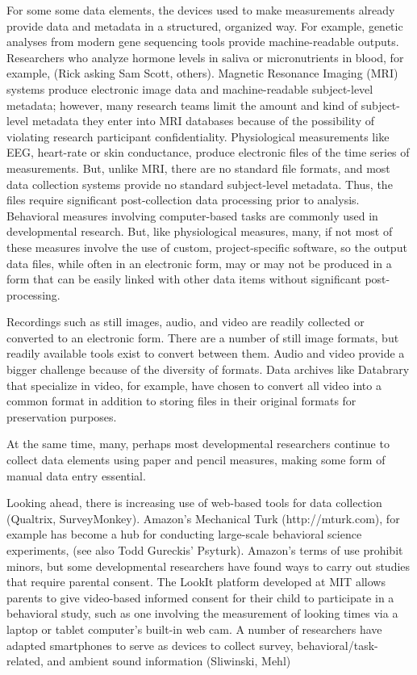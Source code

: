 \documentclass[letterpaper,man,apacite]{apa6}
\begin{document}
For some some data elements, the devices used to make measurements already provide data and metadata in a structured, organized way.
For example, genetic analyses from modern gene sequencing tools provide machine-readable outputs.
Researchers who analyze hormone levels in saliva or micronutrients in blood, for example, (Rick asking Sam Scott, others).
Magnetic Resonance Imaging (MRI) systems produce electronic image data and machine-readable subject-level metadata; however, many research teams limit the amount and kind of subject-level metadata they enter into MRI databases because of the possibility of violating research participant confidentiality.
Physiological measurements like EEG, heart-rate or skin conductance, produce electronic files of the time series of measurements.
But, unlike MRI, there are no standard file formats, and most data collection systems provide no standard subject-level metadata.
Thus, the files require significant post-collection data processing prior to analysis. 
Behavioral measures involving computer-based tasks are commonly used in developmental research.
But, like physiological measures, many, if not most of these measures involve the use of custom, project-specific software, so the output data files, while often in an electronic form, may or may not be produced in a form that can be easily linked with other data items without significant post-processing.

Recordings such as still images, audio, and video are readily collected or converted to an electronic form.
There are a number of still image formats, but readily available tools exist to convert between them.
Audio and video provide a bigger challenge because of the diversity of formats.
Data archives like Databrary that specialize in video, for example, have chosen to convert all video into a common format in addition to storing files in their original formats for preservation purposes.

At the same time, many, perhaps most developmental researchers continue to collect data elements using paper and pencil measures, making some form of manual data entry essential.

Looking ahead, there is increasing use of web-based tools for data collection (Qualtrix, SurveyMonkey).
Amazon's Mechanical Turk (http://mturk.com), for example has become a hub for conducting large-scale behavioral science experiments, (see also Todd Gureckis' Psyturk).
Amazon's terms of use prohibit minors, but some developmental researchers have found ways to carry out studies that require parental consent.
The LookIt platform developed at MIT allows parents to give video-based informed consent for their child to participate in a behavioral study, such as one involving the measurement of looking times via a laptop or tablet computer's built-in web cam.
A number of researchers have adapted smartphones to serve as devices to collect survey, behavioral/task-related, and ambient sound information (Sliwinski, Mehl)
\end{document}

